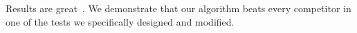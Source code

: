 Results are great~\cite{small}. We demonstrate that our algorithm beats every competitor in one of the tests we specifically designed and modified. 